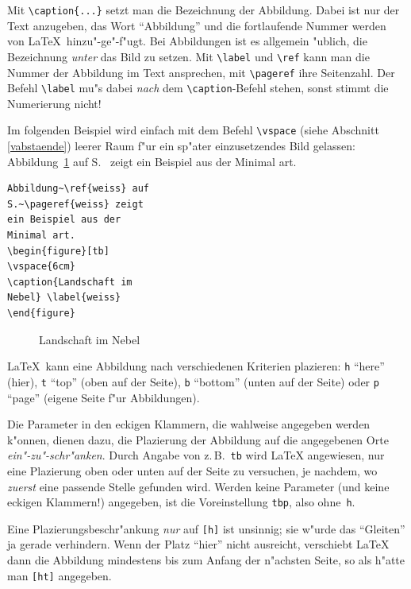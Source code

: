 Mit \verb|\caption{...}| setzt man die Bezeichnung der Abbildung.
Dabei ist nur der Text anzugeben, das Wort "`Abbildung"' und die
fortlaufende Nummer werden von \LaTeX\ hinzu"-ge"-f"ugt.
Bei Abbildungen ist es allgemein "ublich, die Bezeichnung
\emph{unter} das Bild zu setzen.
Mit \verb|\label| und \verb|\ref| kann man die Nummer der
Abbildung im Text ansprechen, mit \verb|\pageref| ihre Seitenzahl.
Der Befehl \verb:\label: mu"s dabei \emph{nach} dem \verb:\caption:-Befehl
stehen, sonst stimmt die Numerierung nicht!

Im folgenden Beispiel wird einfach mit dem Befehl \verb|\vspace|
(siehe Abschnitt \ref{vabstaende})
leerer Raum f"ur ein sp"ater einzusetzendes Bild gelassen:
\exa
Abbildung~\ref{weiss} auf S.~\pageref{weiss} zeigt ein
Beispiel aus der Minimal art.
\exb
\begin{verbatim}
Abbildung~\ref{weiss} auf
S.~\pageref{weiss} zeigt
ein Beispiel aus der 
Minimal art.
\begin{figure}[tb]
\vspace{6cm}
\caption{Landschaft im
Nebel} \label{weiss}
\end{figure}
\end{verbatim}
\exc
\begin{figure}[tb]
\vspace{6cm}
\caption{Landschaft im
Nebel} \label{weiss}
\end{figure}

\LaTeX\ kann eine Abbildung nach verschiedenen Kriterien plazieren:
\texttt{h} "`here"' (hier),
\texttt{t} "`top"' (oben auf der Seite), \texttt{b} "`bottom"' (unten
auf der Seite) oder \texttt{p} "`page"' (eigene Seite f"ur
Abbildungen).

Die Parameter in den eckigen Klammern, die wahlweise angegeben
werden k"onnen, dienen dazu, die Plazierung der Abbildung auf die
angegebenen Orte \emph{ein"-zu"-schr"anken}.  Durch Angabe von
z.\,B.\ \texttt{tb}
wird \LaTeX{} angewiesen, nur eine Plazierung oben oder unten auf der
Seite zu versuchen, je nachdem,
wo \emph{zuerst} eine passende Stelle gefunden wird.
Werden keine Parameter (und keine eckigen
Klammern!) angegeben, ist die Voreinstellung \texttt{tbp},
also ohne~\texttt{h}.

Eine Plazierungsbeschr"ankung \emph{nur} auf \texttt{[h]} ist unsinnig;
sie w"urde das "`Gleiten"' ja gerade verhindern.
Wenn der Platz "`hier"' nicht ausreicht, 
verschiebt \LaTeX{} dann die Abbildung mindestens 
bis zum Anfang der n"achsten Seite, so als h"atte man \texttt{[ht]} angegeben.

